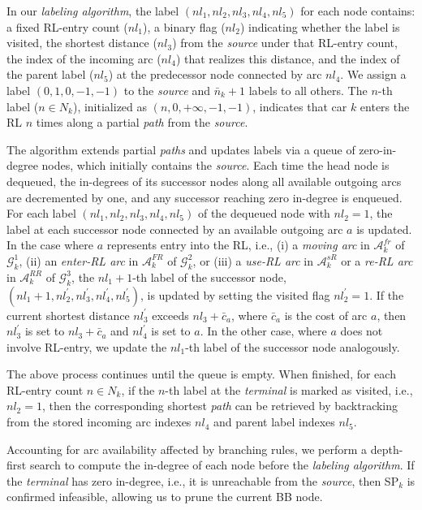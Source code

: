 \documentclass[12pt]{article}
\begin{document}
In our \textit{labeling algorithm}, the label $(nl_1, nl_2, nl_3, nl_4, nl_5)$ for each node contains: a fixed RL-entry count ($nl_1$), a binary flag ($nl_2$) indicating whether the label is visited, the shortest distance ($nl_3$) from the \textit{source} under that RL-entry count, the index of the incoming arc ($nl_4$) that realizes this distance, and the index of the parent label ($nl_5$) at the predecessor node connected by arc $nl_4$. We assign a label $(0, 1, 0, -1, -1)$ to the \textit{source} and $\bar{n}_k+1$ labels to all others. The $n$-th label ($n\in N_k$), initialized as $(n, 0, +\infty, -1, -1)$, indicates that car $k$ enters the RL $n$ times along a partial \textit{path} from the \textit{source}.

The algorithm extends partial \textit{paths} and updates labels via a queue of zero-in-degree nodes, which initially contains the \textit{source}. Each time the head node is dequeued, the in-degrees of its successor nodes along all available outgoing arcs are decremented by one, and any successor reaching zero in-degree is enqueued. For each label $(nl_1, nl_2, nl_3, nl_4, nl_5)$ of the dequeued node with $nl_2 = 1$, the label at each successor node connected by an available outgoing arc $a$ is updated. In the case where $a$ represents entry into the RL, i.e., \textup{(i)} a \textit{moving arc} in $\mathcal{A}^{fr}_k$ of $\mathcal{G}^1_k$, \textup{(ii)} an \textit{enter-RL arc} in $\mathcal{A}^{FR}_k$ of $\mathcal{G}^2_k$, or \textup{(iii)} a \textit{use-RL arc} in $\mathcal{A}^{sR}_k$ or a \textit{re-RL arc} in $\mathcal{A}^{RR}_k$ of $\mathcal{G}^3_k$, the $nl_1+1$-th label of the successor node, $(nl_{1}+1, nl_2^{\prime}, nl_3^{\prime}, nl_4^{\prime}, nl_5^{\prime})$, is updated by setting the visited flag $nl_2^{\prime}=1$. If the current shortest distance $nl_3^{\prime}$ exceeds $nl_3+\bar{c}_a$, where $\bar{c}_a$ is the cost of arc $a$, then $nl_3^{\prime}$ is set to $nl_3+\bar{c}_a$ and $nl_4^{\prime}$ is set to $a$. In the other case, where $a$ does not involve RL-entry, we update the $nl_1$-th label of the successor node analogously.

The above process continues until the queue is empty. When finished, for each RL-entry count $n\in N_k$, if the $n$-th label at the \textit{terminal} is marked as visited, i.e., $nl_2 = 1$, then the corresponding shortest \textit{path} can be retrieved by backtracking from the stored incoming arc indexes $nl_4$ and parent label indexes $nl_5$.

Accounting for arc availability affected by branching rules, we perform a depth-first search to compute the in-degree of each node before the \textit{labeling algorithm}. If the \textit{terminal} has zero in-degree, i.e., it is unreachable from the \textit{source}, then SP$_k$ is confirmed infeasible, allowing us to prune the current BB node.
\end{document}
